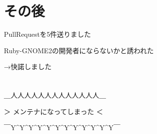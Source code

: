 \section{その後}

\begin{frame}
\begin{itemize}
{\Large
\item PullRequestを5件送りました
\item Ruby-GNOME2の開発者にならないかと誘われた
}
\end{itemize}
{\Huge
→快諾しました
}
\end{frame}

\section{}

\begin{frame}
\begin{center}
{\huge
＿人人人人人人人人人人人人人＿

＞ メンテナになってしまった ＜

￣Y\^{}Y\^{}Y\^{}Y\^{}Y\^{}Y\^{}Y\^{}Y\^{}Y\^{}Y\^{}Y\^{}Y￣
}
\end{center}
\end{frame}
